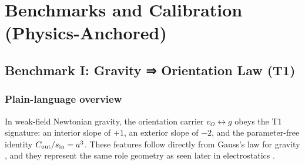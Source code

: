 \documentclass[12pt,a4paper,oneside]{scrreprt}
\begin{document}
\part{Benchmarks and Calibration (Physics-Anchored)}

\chapter{Benchmark I: Gravity ⇒ Orientation Law (T1)}
\section*{Plain-language overview}
In weak-field Newtonian gravity, the orientation carrier $v_O\!\leftrightarrow g$
obeys the T1 signature: an interior slope of $+1$, an exterior slope of $-2$, and the
parameter-free identity $C_{\rm out}/s_{\rm in}=a^3$. 
These features follow directly from Gauss’s law for gravity
\cite{PoissonWill2014,BinneyTremaine2008}, and they represent the same role geometry
as seen later in electrostatics \cite{Jackson1999,Griffiths2017}.
\end{document}
